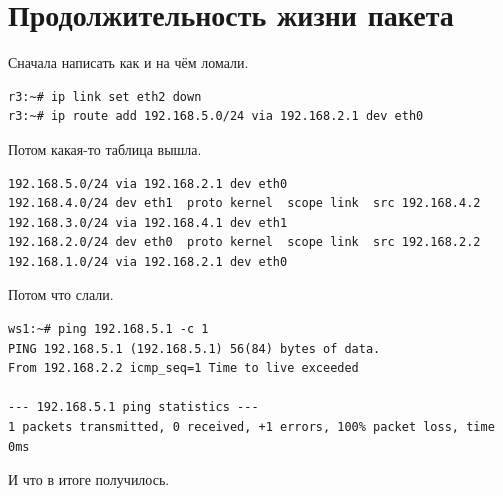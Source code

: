 \documentclass[a4paper,12pt]{article}
\begin{document}
\section{Продолжительность жизни пакета}

Сначала написать как и на чём ломали. 

\begin{Verbatim}
r3:~# ip link set eth2 down
r3:~# ip route add 192.168.5.0/24 via 192.168.2.1 dev eth0
\end{Verbatim}

Потом какая-то таблица вышла.

\begin{Verbatim}
192.168.5.0/24 via 192.168.2.1 dev eth0 
192.168.4.0/24 dev eth1  proto kernel  scope link  src 192.168.4.2 
192.168.3.0/24 via 192.168.4.1 dev eth1 
192.168.2.0/24 dev eth0  proto kernel  scope link  src 192.168.2.2 
192.168.1.0/24 via 192.168.2.1 dev eth0 
\end{Verbatim}

Потом что слали.

\begin{Verbatim}
ws1:~# ping 192.168.5.1 -c 1
PING 192.168.5.1 (192.168.5.1) 56(84) bytes of data.
From 192.168.2.2 icmp_seq=1 Time to live exceeded

--- 192.168.5.1 ping statistics ---
1 packets transmitted, 0 received, +1 errors, 100% packet loss, time 0ms
\end{Verbatim}

И что в итоге получилось.
\end{document}
